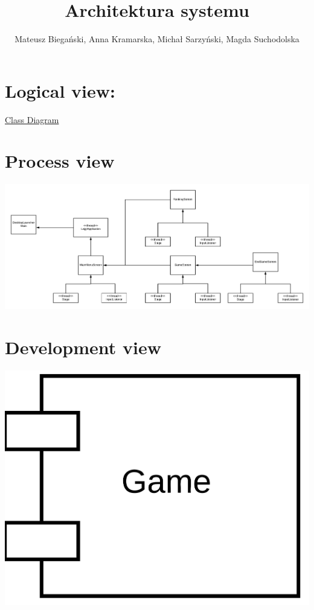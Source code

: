\documentclass{article}
\begin{document}
\title{Architektura systemu}

\author{Mateusz Biegański, Anna Kramarska, Michał Sarzyński, Magda Suchodolska}
\maketitle

\section{Logical view:}
\href{../Palace2D_UML.pdf}{Class Diagram}
\section{Process view}
\begin{center}
    \includegraphics[scale=0.6]{processview.png}
\end{center}

\section{Development view}
\begin{center}
    \includegraphics[scale=0.05]{developmentview.png}
\end{center}
\end{document}
